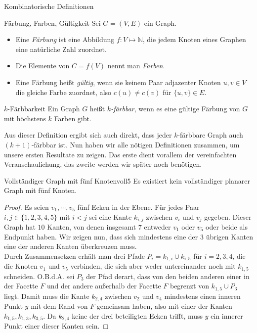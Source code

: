 \begin{section}{Kombinatorische Definitionen}
  \begin{definition}{Färbung, Farben, Gültigkeit}
   Sei $G=(V,E)$ ein Graph.
   \begin{itemize}
   \item Eine \textit{Färbung} ist eine Abbildung $f: V \mapsto \mathbb{N}$, die jedem Knoten eines Graphen eine natürliche Zahl zuordnet. 
   \item Die Elemente von $C  =f(V)$ nennt man \textit{Farben}. 
   \item Eine Färbung heißt \textit{gültig}, wenn sie keinem Paar adjazenter Knoten $u,v \in V$ die gleiche Farbe zuordnet, also $c(u) \neq c(v)$ für $\{u,v\}\in E$. 
   \end{itemize}
  \end{definition}
  
  \begin{definition}{$k$-Färbbarkeit}
   Ein Graph $G$ heißt \textit{$k$-färbbar}, wenn es eine gültige Färbung von $G$ mit höchstens $k$ Farben gibt.
  \end{definition}
  
  Aus dieser Definition ergibt sich auch direkt, dass jeder $k$-färbbare Graph auch $(k+1)$-färbbar ist. Nun haben wir alle nötigen Definitionen zusammen, um unsere ersten Resultate zu zeigen. Das erste dient vorallem der vereinfachten Veranschaulichung, das zweite werden wir später noch benötigen.
  
  \begin{satzl}{Vollständiger Graph mit fünf Knoten}{voll5}
   Es existiert kein vollständiger planarer Graph mit fünf Knoten.
  \end{satzl}
  \begin{proof}
    Es seien $v_1,\cdots,v_5$ fünf Ecken in der Ebene. Für jedes Paar $i,j \in \{1,2,3,4,5\}$ mit $i < j$ sei eine Kante $k_{i,j}$ zwischen $v_i$ und $v_j$ gegeben. Dieser Graph hat $10$ Kanten, von denen insgesamt $7$ entweder $v_1$ oder $v_5$ oder beide als Endpunkt haben. Wir zeigen nun, dass sich mindestens eine der $3$ übrigen Kanten eine der anderen Kanten überkreuzen muss.\\
    Durch Zusammensetzen erhält man drei Pfade $P_i = k_{1,i} \cup k_{i,5}$ für $i = 2,3,4$, die die Knoten $v_1$ und $v_5$ verbinden, die sich aber weder untereinander noch mit $k_{1,5}$ schneiden. O.B.d.A. sei $P_3$ der Pfad derart, dass von den beiden anderen einer in der Facette $F$ und der andere außerhalb der Facette $F$ begrenzt von $k_{1,5} \cup P_3$ liegt. Damit muss die Kante $k_{2,4}$ zwischen $v_2$ und $v_4$ mindestens einen inneren Punkt $y$ mit dem Rand von $F$ gemeinsam haben, also mit einer der Kanten $k_{1,5},k_{1,3},k_{3,5}$. Da $k_{2,4}$ keine der drei beteiligten Ecken trifft, muss $y$ ein innerer Punkt einer dieser Kanten sein.
  \end{proof}
  

\end{section}
